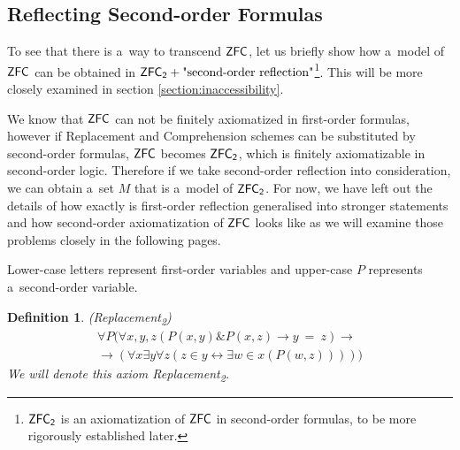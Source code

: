 \documentclass[12pt,a4paper]{article}
\newtheorem{definition}[theorem]{Definition}
\renewcommand{\iff}{\leftrightarrow}
\newcommand{\then}{\rightarrow}
\begin{document}



\subsection{Reflecting Second-order Formulas}


To see that there is a~way to transcend $\sf{ZFC}$, let us briefly show how a~model of $\sf{ZFC}$ can be obtained in $\sf{ZFC}_2 + \mbox{"second-order reflection"}$\footnote{$\sf{ZFC}_2$ is an axiomatization of $\sf{ZFC}$ in second-order formulas, to be more rigorously established later.}. This will be more closely examined in section \ref{section:inaccessibility}.

We know that $\sf{ZFC}$ can not be finitely axiomatized in first-order formulas, however if Replacement and Comprehension schemes can be substituted by second-order formulas, $\sf{ZFC}$ becomes $\sf{ZFC}_2$, which is finitely axiomatizable in second-order logic. Therefore if we take second-order reflection into consideration, we can obtain a~set $M$ that is a~model of $\sf{ZFC}_2$. For now, we have left out the details of how exactly is first-order reflection generalised into stronger statements and how second-order axiomatization of $\sf{ZFC}$ looks like as we will examine those problems closely in the following pages. 


Lower-case letters represent first-order variables and upper-case $P$ represents a~second-order variable. \cite{Shapiro87}
\begin{definition}{(\emph{Replacement}\textsubscript{2})}\label{def:replacement_2}\\
\begin{equation}
\begin{gathered}
\forall P (\forall x, y, z (P(x, y) \& P(x, z) \then y\ =\ z) \then \\
\then (\forall x \exists y \forall z (z \in y \iff \exists w \in x (P(w, z)))))
\end{gathered}
\end{equation}
We will denote this axiom \emph{Replacement}\textsubscript{2}.
\end{definition}
\end{document}
